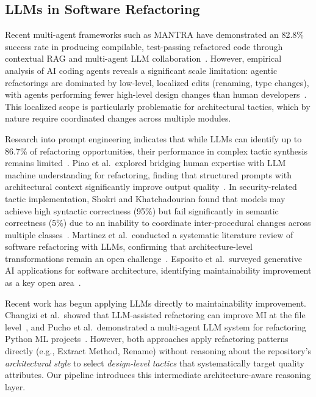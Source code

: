 \documentclass[sigconf,review,anonymous]{acmart}
\begin{document}
\subsection{LLMs in Software Refactoring}
Recent multi-agent frameworks such as MANTRA have demonstrated an 82.8\% success rate in producing compilable, test-passing refactored code through contextual RAG and multi-agent LLM collaboration~\cite{xu2025mantra}. However, empirical analysis of AI coding agents reveals a significant scale limitation: agentic refactorings are dominated by low-level, localized edits (renaming, type changes), with agents performing fewer high-level design changes than human developers~\cite{horikawa2025agentic}. This localized scope is particularly problematic for architectural tactics, which by nature require coordinated changes across multiple modules.

Research into prompt engineering indicates that while LLMs can identify up to 86.7\% of refactoring opportunities, their performance in complex tactic synthesis remains limited~\cite{liu2025exploring}. Piao et al.\ explored bridging human expertise with LLM machine understanding for refactoring, finding that structured prompts with architectural context significantly improve output quality~\cite{piao2025refactoring}. In security-related tactic implementation, Shokri and Khatchadourian found that models may achieve high syntactic correctness (95\%) but fail significantly in semantic correctness (5\%) due to an inability to coordinate inter-procedural changes across multiple classes~\cite{shokri2024ipsynth}. Martinez et al.\ conducted a systematic literature review of software refactoring with LLMs, confirming that architecture-level transformations remain an open challenge~\cite{martinez2025refactoring}. Esposito et al.\ surveyed generative AI applications for software architecture, identifying maintainability improvement as a key open area~\cite{esposito2025genai}.

Recent work has begun applying LLMs directly to maintainability improvement. Changizi et al.\ showed that LLM-assisted refactoring can improve MI at the file level~\cite{changizi2025enhancing}, and Pucho et al.\ demonstrated a multi-agent LLM system for refactoring Python ML projects~\cite{pucho2025refactoring}. However, both approaches apply refactoring patterns directly (e.g., Extract Method, Rename) without reasoning about the repository's \textit{architectural style} to select \textit{design-level tactics} that systematically target quality attributes. Our pipeline introduces this intermediate architecture-aware reasoning layer.
\end{document}
